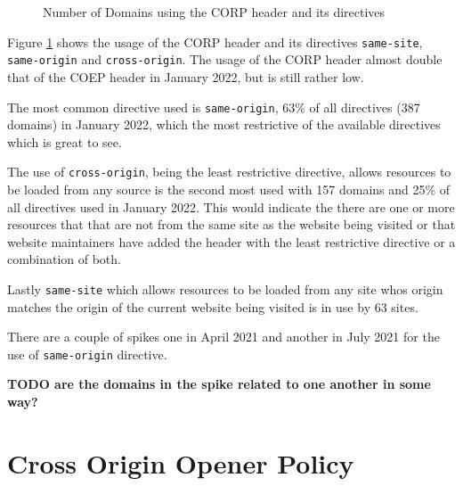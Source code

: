 \documentclass{mscreport}
\begin{document}
\begin{figure}[t]
	\begin{center}
		\caption{Number of Domains using the CORP header and its directives}
		\label{fig:corp_overview}
	\end{center}
\end{figure}

\noindent
Figure \ref{fig:corp_overview} shows the usage of the CORP header and its directives \texttt{same-site}, \texttt{same-origin} and \texttt{cross-origin}. The usage of the CORP header almost double that of the COEP header in January 2022, but is still rather low.

\vspace{0.3cm} \noindent
The most common directive used is \texttt{same-origin},  63\% of all directives (387 domains) in January 2022, which the most restrictive of the available directives which is great to see.

\vspace{0.3cm} \noindent
The use of \texttt{cross-origin}, being the least restrictive directive, allows resources to be loaded from any source is the second most used with 157 domains and 25\% of all directives used in January 2022. This would indicate the there are one or more resources that that are not from the same site as the website being visited or that website maintainers have added the header with the least restrictive directive or a combination of both.

\vspace{0.3cm} \noindent
Lastly \texttt{same-site} which allows resources to be loaded from any site whos origin matches the origin of the current website being visited is in use by 63 sites.

\vspace{0.3cm} \noindent
There are a couple of spikes one in April 2021 and another in July 2021 for the use of \texttt{same-origin} directive.

\vspace{0.3cm} \noindent
\textbf{TODO are the domains in the spike related to one another in some way?}

\clearpage
\newpage


\section{Cross Origin Opener Policy}
\label{section:coop}
\end{document}
